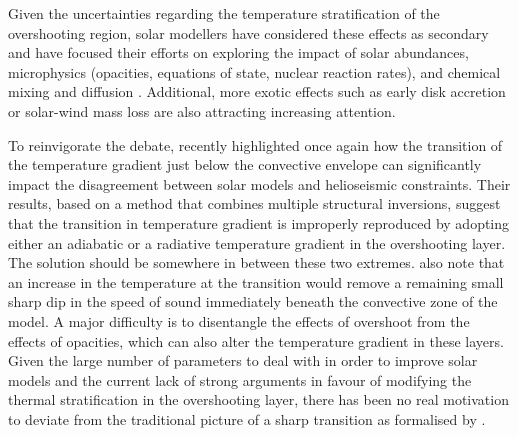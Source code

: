 \documentclass[traditabstract]{aa}
\newcommand{\3}{\ss}
\newcommand{\cp}{\citep}
\newcommand{\ct}{\citet}
\begin{document}
Given the uncertainties regarding  the temperature stratification of the overshooting region, solar modellers have considered these effects as secondary and have focused their efforts on exploring the impact of solar abundances, microphysics (opacities, equations of state, nuclear reaction rates), and chemical mixing and diffusion \cp[see details and references in the review of][]{buldgen19b}. Additional, more exotic effects such as early disk accretion or solar-wind mass loss \cp[][]{zhang19, kunitomo21} are also attracting increasing attention.

To reinvigorate the debate,  \ct{buldgen19a} recently highlighted once again how the transition of the temperature gradient just below the convective envelope can significantly impact the disagreement between solar models and helioseismic constraints. Their results, based on a method that combines multiple structural inversions,  suggest that the transition in temperature gradient is improperly reproduced by adopting either an adiabatic  or a radiative temperature gradient in the overshooting layer. The solution should be somewhere in between these two extremes. \ct{christensen18} also note that
an increase in the temperature at the transition would
remove a remaining small sharp dip in the speed of
sound immediately beneath the convective zone of the model. A major difficulty is to disentangle the effects of overshoot from the effects of opacities, which can also alter the temperature gradient in these layers. Given  the large number of parameters to deal with in order to improve solar models and the current lack of strong arguments in favour of modifying the thermal stratification in the overshooting layer, there has been no real motivation to deviate from the traditional picture of a sharp transition as formalised by \ct{zahn91}.
\end{document}
